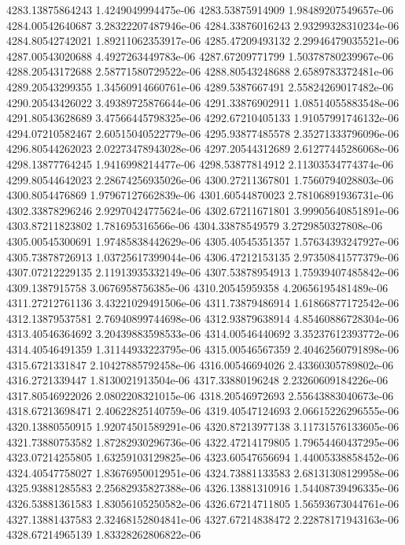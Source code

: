 {4283.13875864243 1.4249049994475e-06
4283.53875914909 1.98489207549657e-06
4284.00542640687 3.28322207487946e-06
4284.33876016243 2.93299328310234e-06
4284.80542742021 1.89211062353917e-06
4285.47209493132 2.29946479035521e-06
4287.00543020688 4.4927263449783e-06
4287.67209771799 1.50378780239967e-06
4288.20543172688 2.58771580729522e-06
4288.80543248688 2.6589783372481e-06
4289.20543299355 1.34560914660761e-06
4289.5387667491 2.55824269017482e-06
4290.20543426022 3.49389725876644e-06
4291.33876902911 1.08514055883548e-06
4291.80543628689 3.47566445798325e-06
4292.67210405133 1.91057991746132e-06
4294.07210582467 2.60515040522779e-06
4295.93877485578 2.35271333796096e-06
4296.80544262023 2.02273478943028e-06
4297.20544312689 2.61277445286068e-06
4298.13877764245 1.9416998214477e-06
4298.53877814912 2.11303534774374e-06
4299.80544642023 2.28674256935026e-06
4300.27211367801 1.7560794028803e-06
4300.8054476869 1.97967127662839e-06
4301.60544870023 2.78106891936731e-06
4302.33878296246 2.92970424775624e-06
4302.67211671801 3.99905640851891e-06
4303.87211823802 1.781695316566e-06
4304.33878549579 3.2729850327808e-06
4305.00545300691 1.97485838442629e-06
4305.40545351357 1.57634393247927e-06
4305.73878726913 1.03725617399044e-06
4306.47212153135 2.97350841577379e-06
4307.07212229135 2.11913935332149e-06
4307.53878954913 1.75939407485842e-06
4309.1387915758 3.0676958756385e-06
4310.20545959358 4.20656195481489e-06
4311.27212761136 3.43221029491506e-06
4311.73879486914 1.61866877172542e-06
4312.13879537581 2.76940899744698e-06
4312.93879638914 4.85460886728304e-06
4313.40546364692 3.20439883598533e-06
4314.00546440692 3.35237612393772e-06
4314.40546491359 1.31144933223795e-06
4315.00546567359 2.40462560791898e-06
4315.6721331847 2.10427885792458e-06
4316.00546694026 2.43360305789802e-06
4316.2721339447 1.8130021913504e-06
4317.33880196248 2.23260609184226e-06
4317.80546922026 2.0802208321015e-06
4318.20546972693 2.55643883040673e-06
4318.67213698471 2.40622825140759e-06
4319.40547124693 2.06615226296555e-06
4320.13880550915 1.92074501589291e-06
4320.87213977138 3.11731576133605e-06
4321.73880753582 1.87282930296736e-06
4322.47214179805 1.79654460437295e-06
4323.07214255805 1.63259103129825e-06
4323.60547656694 1.44005338858452e-06
4324.40547758027 1.83676950012951e-06
4324.73881133583 2.68131308129958e-06
4325.93881285583 2.25682935827388e-06
4326.13881310916 1.54408739496335e-06
4326.53881361583 1.83056105250582e-06
4326.67214711805 1.56593673044761e-06
4327.13881437583 2.32468152804841e-06
4327.67214838472 2.22878171943163e-06
4328.67214965139 1.83328262806822e-06
}
